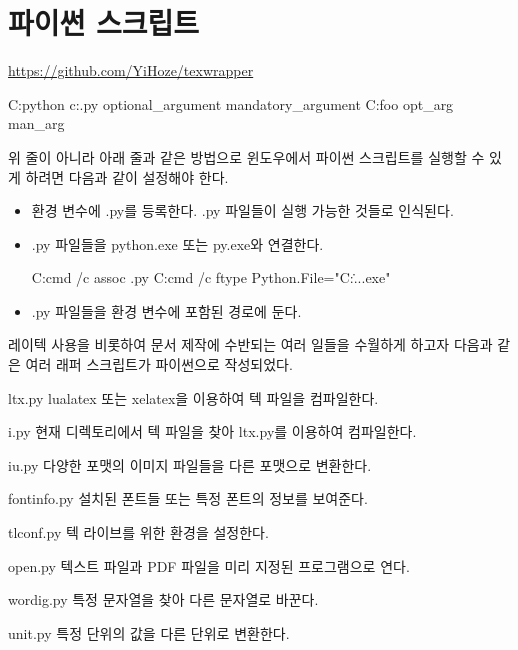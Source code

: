 \chapter{파이썬 스크립트}

\MacroIndexDisable
{}

\begin{flushright}
\url{https://github.com/YiHoze/texwrapper}
\end{flushright}

\begin{code}
C:\>python c:\home\bin\foo.py optional_argument mandatory_argument
C:\>foo opt_arg man_arg
\end{code}

위 줄이 아니라 아래 줄과 같은 방법으로 윈도우에서 파이썬 스크립트를 실행할 수 있게 하려면 다음과 같이 설정해야 한다.

\begin{itemize}

\item {} 환경 변수에 .py를 등록한다. .py 파일들이 실행 가능한 것들로 인식된다.

\item .py 파일들을 python.exe 또는 py.exe와 연결한다.

\begin{code}
C:\>cmd /c assoc .py
C:\>cmd /c ftype Python.File="C:\Users\...\python.exe" %
\end{code}

\item .py 파일들을  환경 변수에 포함된 경로에 둔다.

\end{itemize}

레이텍 사용을 비롯하여 문서 제작에 수반되는 여러 일들을 수월하게 하고자 다음과 같은 여러 래퍼 스크립트가 파이썬으로 작성되었다.

\begin{macros}
\item[ltx.py] lualatex 또는 xelatex을 이용하여 텍 파일을 컴파일한다.
\item[i.py] 현재 디렉토리에서 텍 파일을 찾아 ltx.py를 이용하여 컴파일한다.
\item[iu.py] 다양한 포맷의 이미지 파일들을 다른 포맷으로 변환한다.
\item[fontinfo.py] 설치된 폰트들 또는 특정 폰트의 정보를 보여준다.
\item[tlconf.py] 텍 라이브를 위한 환경을 설정한다.
\item[open.py] 텍스트 파일과 PDF 파일을 미리 지정된 프로그램으로 연다.
\item[wordig.py] 특정 문자열을 찾아 다른 문자열로 바꾼다.
\item[unit.py] 특정 단위의 값을 다른 단위로 변환한다.
\end{macros}


